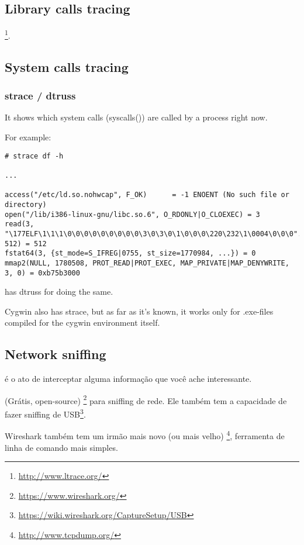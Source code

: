 \subsection{Library calls tracing}

\footnote{\url{http://www.ltrace.org/}}.

\subsection{System calls tracing}

\label{strace}
\subsubsection{strace / dtruss}

It shows which system calls (syscalls()) are called by a process right now.

For example:

\begin{lstlisting}
# strace df -h

...

access("/etc/ld.so.nohwcap", F_OK)      = -1 ENOENT (No such file or directory)
open("/lib/i386-linux-gnu/libc.so.6", O_RDONLY|O_CLOEXEC) = 3
read(3, "\177ELF\1\1\1\0\0\0\0\0\0\0\0\0\3\0\3\0\1\0\0\0\220\232\1\0004\0\0\0"..., 512) = 512
fstat64(3, {st_mode=S_IFREG|0755, st_size=1770984, ...}) = 0
mmap2(NULL, 1780508, PROT_READ|PROT_EXEC, MAP_PRIVATE|MAP_DENYWRITE, 3, 0) = 0xb75b3000
\end{lstlisting}

\myindex{\MacOSX}
\MacOSX has dtruss for doing the same.

Cygwin also has strace, but as far as it's known, it works only for .exe-files
compiled for the cygwin environment itself.

\subsection{Network sniffing}

 é o ato de interceptar alguma informação que você ache interessante.

(Grátis, open-source) \footnote{\url{https://www.wireshark.org/}} para sniffing de rede.
Ele também tem a capacidade de fazer sniffing de USB\footnote{\url{https://wiki.wireshark.org/CaptureSetup/USB}}.

Wireshark também tem um irmão mais novo (ou mais velho) \footnote{\url{http://www.tcpdump.org/}}, ferramenta de linha de comando mais simples.

